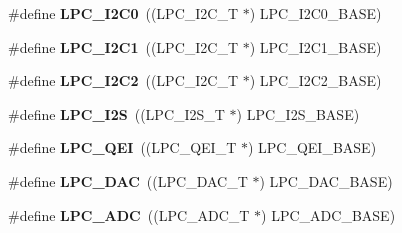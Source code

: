 \begin{DoxyCompactItemize}
\item 
\hypertarget{group___p_e_r_i_p_h__175_x__6_x___b_a_s_e_ga14b6c56857e970a682a9bb22a0cb6716}{\#define {\bfseries L\+P\+C\+\_\+\+I2\+C0}~((L\+P\+C\+\_\+\+I2\+C\+\_\+\+T              $\ast$) L\+P\+C\+\_\+\+I2\+C0\+\_\+\+B\+A\+S\+E)}\label{group___p_e_r_i_p_h__175_x__6_x___b_a_s_e_ga14b6c56857e970a682a9bb22a0cb6716}

\item 
\hypertarget{group___p_e_r_i_p_h__175_x__6_x___b_a_s_e_gad6d6333e47875813be171cffef258837}{\#define {\bfseries L\+P\+C\+\_\+\+I2\+C1}~((L\+P\+C\+\_\+\+I2\+C\+\_\+\+T              $\ast$) L\+P\+C\+\_\+\+I2\+C1\+\_\+\+B\+A\+S\+E)}\label{group___p_e_r_i_p_h__175_x__6_x___b_a_s_e_gad6d6333e47875813be171cffef258837}

\item 
\hypertarget{group___p_e_r_i_p_h__175_x__6_x___b_a_s_e_ga6bcdaa0ab66f4e3d213a488b34055557}{\#define {\bfseries L\+P\+C\+\_\+\+I2\+C2}~((L\+P\+C\+\_\+\+I2\+C\+\_\+\+T              $\ast$) L\+P\+C\+\_\+\+I2\+C2\+\_\+\+B\+A\+S\+E)}\label{group___p_e_r_i_p_h__175_x__6_x___b_a_s_e_ga6bcdaa0ab66f4e3d213a488b34055557}

\item 
\hypertarget{group___p_e_r_i_p_h__175_x__6_x___b_a_s_e_ga1d2800cab1a50bdf99efe66d6028b663}{\#define {\bfseries L\+P\+C\+\_\+\+I2\+S}~((L\+P\+C\+\_\+\+I2\+S\+\_\+\+T              $\ast$) L\+P\+C\+\_\+\+I2\+S\+\_\+\+B\+A\+S\+E)}\label{group___p_e_r_i_p_h__175_x__6_x___b_a_s_e_ga1d2800cab1a50bdf99efe66d6028b663}

\item 
\hypertarget{group___p_e_r_i_p_h__175_x__6_x___b_a_s_e_ga71347b58898f54f8e9f00a6c652c7d49}{\#define {\bfseries L\+P\+C\+\_\+\+Q\+E\+I}~((L\+P\+C\+\_\+\+Q\+E\+I\+\_\+\+T              $\ast$) L\+P\+C\+\_\+\+Q\+E\+I\+\_\+\+B\+A\+S\+E)}\label{group___p_e_r_i_p_h__175_x__6_x___b_a_s_e_ga71347b58898f54f8e9f00a6c652c7d49}

\item 
\hypertarget{group___p_e_r_i_p_h__175_x__6_x___b_a_s_e_ga5b94918e9ea326d84ab862a5d377903b}{\#define {\bfseries L\+P\+C\+\_\+\+D\+A\+C}~((L\+P\+C\+\_\+\+D\+A\+C\+\_\+\+T              $\ast$) L\+P\+C\+\_\+\+D\+A\+C\+\_\+\+B\+A\+S\+E)}\label{group___p_e_r_i_p_h__175_x__6_x___b_a_s_e_ga5b94918e9ea326d84ab862a5d377903b}

\item 
\hypertarget{group___p_e_r_i_p_h__175_x__6_x___b_a_s_e_gab6eaf639d3a1eec83583a9e11ab7336f}{\#define {\bfseries L\+P\+C\+\_\+\+A\+D\+C}~((L\+P\+C\+\_\+\+A\+D\+C\+\_\+\+T              $\ast$) L\+P\+C\+\_\+\+A\+D\+C\+\_\+\+B\+A\+S\+E)}\label{group___p_e_r_i_p_h__175_x__6_x___b_a_s_e_gab6eaf639d3a1eec83583a9e11ab7336f}


\end{DoxyCompactItemize}
